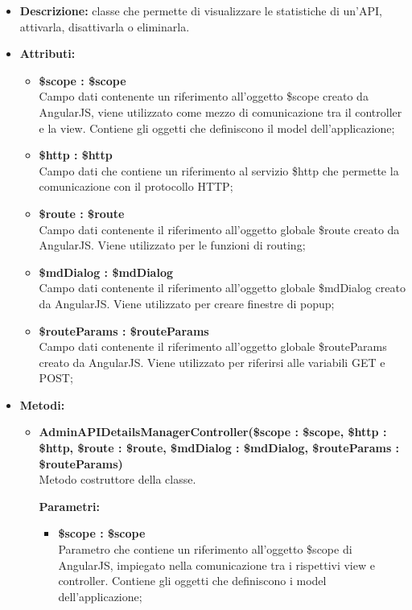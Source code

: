 \begin{itemize}
	\item \textbf{Descrizione:} classe che permette di visualizzare le statistiche di un'API, attivarla, disattivarla o eliminarla.
	\item \textbf{Attributi:}
	\begin{itemize}
		\item \textbf{\$scope : \$scope}\\
		Campo dati contenente un riferimento all'oggetto \$scope creato da AngularJS, viene utilizzato come mezzo di comunicazione tra il controller e la view. Contiene gli oggetti che definiscono il model dell'applicazione;
		
		\item \textbf{\$http : \$http }\\
		Campo dati che contiene un riferimento al servizio \$http che permette la comunicazione con il protocollo HTTP;
		
		\item \textbf{\$route : \$route }\\
		Campo dati contenente il riferimento all'oggetto globale \$route creato da AngularJS. Viene utilizzato per le funzioni di routing;
		
		\item \textbf{\$mdDialog : \$mdDialog }\\
		Campo dati contenente il riferimento all'oggetto globale \$mdDialog creato da AngularJS. Viene utilizzato per creare finestre di popup;
		
		\item \textbf{\$routeParams : \$routeParams }\\
		Campo dati contenente il riferimento all'oggetto globale \$routeParams creato da AngularJS. Viene utilizzato per riferirsi alle variabili GET e POST;
		
		
	\end{itemize}
	\item \textbf{Metodi:}
	\begin{itemize}
		
		\item \textbf{AdminAPIDetailsManagerController(\$scope : \$scope, \$http : \$http, \$route : \$route, \$mdDialog : \$mdDialog, \$routeParams : \$routeParams)}\\
		Metodo costruttore della classe.
		\begin{description}
			\item[\textbf{Parametri:}]
		\end{description}
		\begin{itemize}
			\item \textbf{\$scope : \$scope}\\
			Parametro che contiene un riferimento all'oggetto \$scope di AngularJS, impiegato nella comunicazione tra i rispettivi view e controller. Contiene gli oggetti che definiscono i model dell'applicazione;
			

\end{itemize}
\end{itemize}
\end{itemize}
